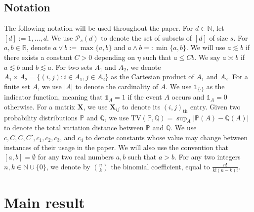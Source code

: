 \documentclass{article}
\newcommand{\R}{\mathbb{R}}
\newcommand{\X}{\mathbf{X}}
\newcommand{\bbP}{\mathbb{P}}
\newcommand{\one}{\mathds{1}}
\theoremstyle{remark}
\begin{document}
\subsection{Notation}

The following notation will be used throughout the paper. For $d \in \mathbb N$, let $[d] := {1,...,d}$. We use $\mathcal P_s(d)$ to denote the set of subsets of $[d]$ of size $s$. For $a,b \in \R$,
denote $a \lor b:= \max\{a,b\}$ and $a \land b =: \min\{a,b\}$.  We will use $a \lesssim b$ if there exists a constant $C > 0$ depending on $\eta$ such that $a \leq C b$. We say $a \asymp b$ if $a \lesssim b$ and $b \lesssim a$. For two sets $A_1$ and $A_2$, we denote $A_1 \times A_2 = \{(i,j) : i \in A_1, j \in A_2\}$ as the Cartesian product of $A_1$ and $A_2$. For a finite set $A$, we use $|A|$ to denote the cardinality of $A$. We use $\one_{\{\cdot\}}$ as the indicator function, meaning that $\one_{A} = 1$ if the event $A$ occurs and $\one_{A} = 0$ otherwise. For a matrix $\mathbf X$, we use $\X_{ij}$ to denote its $(i,j)_{\text{th}}$ entry. Given two probability distributions $\bbP$ and $\mathbb Q$, we use $\text{TV}(\bbP, \mathbb Q) = \sup_A|\bbP(A) - \mathbb Q(A)|$ to denote the total variation distance between $\bbP$ and $\mathbb Q$. We use $c, C, \bar{C}, C', c_1, c_2, c_3$, and $c_4$ to denote constants whose value may change between instances of their usage in the paper. 
We will also use the convention that $[a,b] = \emptyset$ for any two real numbers $a,b$ such that $a>b$. 
For any two integers $n,k \in \mathbb N\cup \{0\}$, we denote by ${n \choose k}$ the binomial coefficient, equal to $\frac{n!}{k! (n-k)!}$.


\section{Main result}\label{sec_main}
\end{document}
